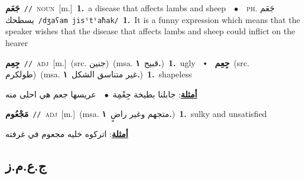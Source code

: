 \documentclass[10pt,a4paper,twoside]{article} %
\begin{document}
\begin{multicols}{2}
{\setlength\topsep{0pt}\textbf{\foreignlanguage{arabic}{جَعَم}}\ {\color{gray}\texttt{//}\color{black}}\ \textsc{noun}\ [m.]\ \textbf{1.}~a disease that affects lambs and sheep\ \ $\bullet$\ \ \textsc{ph.} \color{gray} \foreignlanguage{arabic}{جَعَم يسطحك}\color{black}\ {\color{gray}\texttt{/{\sffamily dʒaʕam jisˤtˤaħak}/}\color{black}}\ \textbf{1.}~It is a funny expression which means that the speaker wishes that the disease that affects lambs and sheep could inflict on the hearer\ } \vspace{2mm}

{\setlength\topsep{0pt}\textbf{\foreignlanguage{arabic}{جِعِم}}\ {\color{gray}\texttt{//}\color{black}}\ \textsc{adj}\ [m.]\ (src. \color{gray}\foreignlanguage{arabic}{جنين}\color{black})\ \color{gray}(msa. \foreignlanguage{arabic}{قبيح}~\foreignlanguage{arabic}{\textbf{١.}})\color{black}\ \textbf{1.}~ugly\ \ $\smblkdiamond$\ \ \setlength\topsep{0pt}\textbf{\foreignlanguage{arabic}{جِعِم}}\ (src. \color{gray}\foreignlanguage{arabic}{طولكرم}\color{black})\ \color{gray}(msa. \foreignlanguage{arabic}{غير متناسق الشكل}~\foreignlanguage{arabic}{\textbf{١.}})\color{black}\ \textbf{1.}~shapeless\  \begin{flushright}\color{gray}\foreignlanguage{arabic}{\textbf{\underline{\foreignlanguage{arabic}{أمثلة}}}: جابلنا بطيخة جِعْمِة\ $\bullet$\ \  عريسها جعم هي احلى منه}\end{flushright}\color{black}} \vspace{2mm}

{\setlength\topsep{0pt}\textbf{\foreignlanguage{arabic}{مَجْعُوم}}\ {\color{gray}\texttt{//}\color{black}}\ \textsc{adj}\ [m.]\ \color{gray}(msa. \foreignlanguage{arabic}{متجهم وغير راضٍ}~\foreignlanguage{arabic}{\textbf{١.}})\color{black}\ \textbf{1.}~sulky and unsatisfied\  \begin{flushright}\color{gray}\foreignlanguage{arabic}{\textbf{\underline{\foreignlanguage{arabic}{أمثلة}}}: اتركوه خليه مجعوم في غرفته}\end{flushright}\color{black}} \vspace{2mm}

\vspace{-3mm}
\subsection*{\color{blue}\foreignlanguage{arabic}{ج.ع.م.ز}\color{blue}{}} 


\end{multicols}
\end{document}

